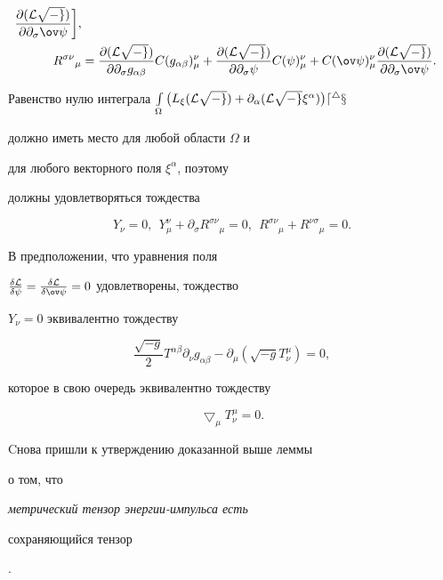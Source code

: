 \begin{align*}
\frac{\partial( \cal L\sqrt{-g})}{\partial\partial_\sigma\ov\psi}\bigg], \\


%


R^{\sigma\nu}{}_\mu&= \frac{\partial( \cal L\sqrt{-g})}


{\partial \partial_\sigma g_{\alpha\beta}}C(


g_{\alpha\beta})^\nu_\mu+


\frac{\partial( \cal L\sqrt{-g})}{\partial\partial_\sigma


\psi}C( \psi)^\nu_\mu+C(\ov\psi)^\nu_\mu


\frac{\partial( \cal L\sqrt{-g})}{\partial\partial_\sigma\ov\psi}.


\end{align*}


Равенство нулю интеграла $\int\limits_\Omega \big(


L_\xi( \cal L\sqrt{-g})+\partial_\alpha


( \cal L\sqrt{-g}\xi^\alpha)\big)d^4x$ 


должно иметь место для любой области $\Omega$ и


для любого векторного поля $\xi^\alpha$, поэтому


должны удовлетворяться тождества


$$


Y_\nu=0,\ \ Y^\nu_\mu+\partial_\sigma R^{\sigma\nu}{}_\mu=0,\ \


R^{\sigma\nu}{}_\mu+R^{\nu\sigma}{}_\mu=0.


$$


В предположении, что уравнения поля


$\frac{\delta \cal L}{\delta\psi}=\frac{\delta \cal L}


{\delta\ov\psi}=0 $ удовлетворены, тождество


$ Y_\nu=0 $ эквивалентно тождеству


$$


\frac{\sqrt{-g}}{2}T^{\alpha\beta}\partial_\nu g_{\alpha\beta}-


\partial_\mu(\sqrt{-g}T_\nu^\mu)=0,


$$


которое в свою очередь эквивалентно тождеству


$$


\bigtriangledown_\mu T_\nu^\mu=0.


$$


Cнова пришли к утверждению доказанной выше леммы


о том, что {\it метрический тензор энергии-импульса есть


сохраняющийся тензор}.





